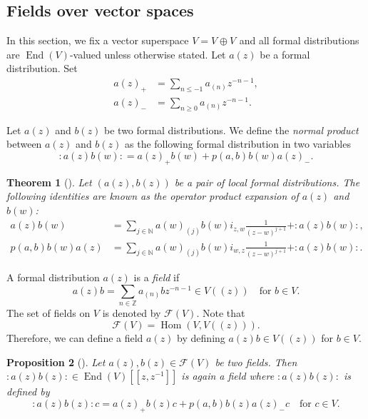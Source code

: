 \documentclass[a4paper, 12pt, reqno]{amsart}
\newtheorem{theorem}{Theorem}[section]
\newtheorem{proposition}[theorem]{Proposition}
\theoremstyle{remark}
\numberwithin{equation}{subsection}
\DeclareMathOperator{\End}{End}
\DeclareMathOperator{\zero}{\overline{0}}
\DeclareMathOperator{\one}{\overline{1}}
\DeclareMathOperator{\Hom}{Hom}
\begin{document}
\subsection{Fields over vector spaces}
\label{sec:fields-over-vector}

In this section, we fix a vector superspace $V = V_{\zero} \oplus V_{\one}$ and all formal distributions are $\End(V)$-valued unless otherwise stated.
Let $a(z)$ be a formal distribution.
Set
\begin{align*}
  a(z)_+ &= \sum_{n \le -1}a_{(n)}z^{-n - 1}, \\
  a(z)_- &= \sum_{n \ge 0}a_{(n)}z^{-n - 1}.
\end{align*}

Let $a(z)$ and $b(z)$ be two formal distributions.
We define the \emph{normal product} between $a(z)$ and $b(z)$ as the following formal distribution in two variables
\begin{equation*}
  :a(z)b(w): = a(z)_+b(w) + p(a, b)b(w)a(z)_-.
\end{equation*}

\begin{theorem}[{\cite[Proposition 3.2.3]{nozaradan_introduction_2008}}]
  \label{thr:11}
  Let $(a(z), b(z))$ be a pair of local formal distributions.
  The following identities are known as the operator product expansion of $a(z)$ and $b(w)$:
  \begin{align*}
    a(z)b(w) &= \sum_{j \in \mathbb{N}}a(w)_{(j)}b(w)i_{z, w}\frac{1}{(z - w)^{j + 1}} + :a(z)b(w):, \\
    p(a, b)b(w)a(z) &= \sum_{j \in \mathbb{N}}a(w)_{(j)}b(w)i_{w, z}\frac{1}{(z - w)^{j + 1}} + :a(z)b(w):.
  \end{align*}
\end{theorem}

A formal distribution $a(z)$ is a \emph{field} if
\begin{equation*}
  a(z)b = \sum_{n \in \mathbb{Z}}a_{(n)}bz^{-n - 1} \in V((z)) \quad \text{for } b \in V.
\end{equation*}
The set of fields on $V$ is denoted by $\mathcal{F}(V)$.
Note that
\begin{equation*}
  \mathcal{F}(V) = \Hom(V, V((z))).
\end{equation*}
Therefore, we can define a field $a(z)$ by defining $a(z)b \in V((z))$ for $b \in V$.

\begin{proposition}[{\cite[Proposition 3.3.2]{nozaradan_introduction_2008}}]
  \label{prp:6}
  Let $a(z), b(z) \in \mathcal{F}(V)$ be two fields.
  Then $:a(z)b(z): \in \End(V)[[z,z^{-1}]]$ is again a field where $:a(z)b(z):$ is defined by
  \begin{equation*}
    :a(z)b(z):c = a(z)_+b(z)c + p(a, b)b(z)a(z)_-c \quad \text{for }c \in V.
  \end{equation*}
\end{proposition}
\end{document}
